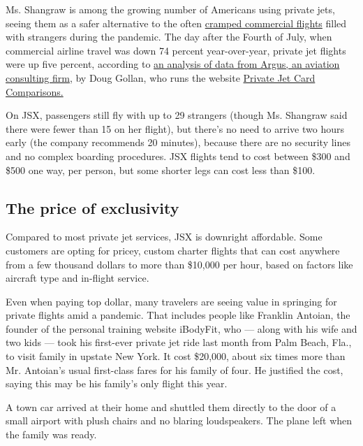 Ms. Shangraw is among the growing number of Americans using private
jets, seeing them as a safer alternative to the often
\href{https://www.nytimes3xbfgragh.onion/2020/07/21/travel/crowded-flights-coronavirus.html}{cramped
commercial flights} filled with strangers during the pandemic. The day
after the Fourth of July, when commercial airline travel was down 74
percent year-over-year, private jet flights were up five percent,
according to
\href{https://privatejetcardcomparisons.com/2020/07/10/heres-where-the-private-jets-were-flying-for-the-july-4th-holiday/\#more-38454}{an
analysis of data from Argus, an aviation consulting firm}, by Doug
Gollan, who runs the website
\href{https://privatejetcardcomparisons.com/}{Private Jet Card
Comparisons.}

On JSX, passengers still fly with up to 29 strangers (though Ms.
Shangraw said there were fewer than 15 on her flight), but there's no
need to arrive two hours early (the company recommends 20 minutes),
because there are no security lines and no complex boarding procedures.
JSX flights tend to cost between \$300 and \$500 one way, per person,
but some shorter legs can cost less than \$100.

\hypertarget{the-price-of-exclusivity}{%
\subsection{The price of exclusivity}\label{the-price-of-exclusivity}}

Compared to most private jet services, JSX is downright affordable. Some
customers are opting for pricey, custom charter flights that can cost
anywhere from a few thousand dollars to more than \$10,000 per hour,
based on factors like aircraft type and in-flight service.

Even when paying top dollar, many travelers are seeing value in
springing for private flights amid a pandemic. That includes people like
Franklin Antoian, the founder of the personal training website iBodyFit,
who --- along with his wife and two kids --- took his first-ever private
jet ride last month from Palm Beach, Fla., to visit family in upstate
New York. It cost \$20,000, about six times more than Mr. Antoian's
usual first-class fares for his family of four. He justified the cost,
saying this may be his family's only flight this year.

A town car arrived at their home and shuttled them directly to the door
of a small airport with plush chairs and no blaring loudspeakers. The
plane left when the family was ready.

